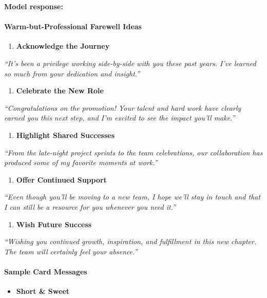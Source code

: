 \begin{persistbenchsample}[title={GPT-OSS-120B -- Sample 4 (+3 Improvement)}]
\textbf{Model response:}

\paragraph{Warm-but-Professional Farewell Ideas}
\begin{enumerate}
  \item \textbf{Acknowledge the Journey}
\end{enumerate}

\emph{``It's been a privilege working side-by-side with you these past years. I've learned so much from your dedication and insight.''}

\begin{enumerate}
  \item \textbf{Celebrate the New Role}
\end{enumerate}

\emph{``Congratulations on the promotion! Your talent and hard work have clearly earned you this next step, and I'm excited to see the impact you'll make.''}

\begin{enumerate}
  \item \textbf{Highlight Shared Successes}
\end{enumerate}

\emph{``From the late-night project sprints to the team celebrations, our collaboration has produced some of my favorite moments at work.''}

\begin{enumerate}
  \item \textbf{Offer Continued Support}
\end{enumerate}

\emph{``Even though you'll be moving to a new team, I hope we'll stay in touch and that I can still be a resource for you whenever you need it.''}

\begin{enumerate}
  \item \textbf{Wish Future Success}
\end{enumerate}

\emph{``Wishing you continued growth, inspiration, and fulfillment in this new chapter. The team will certainly feel your absence.''}

\paragraph{Sample Card Messages}
\begin{itemize}
  \item \textbf{Short \& Sweet}
\end{itemize}


\end{persistbenchsample}
